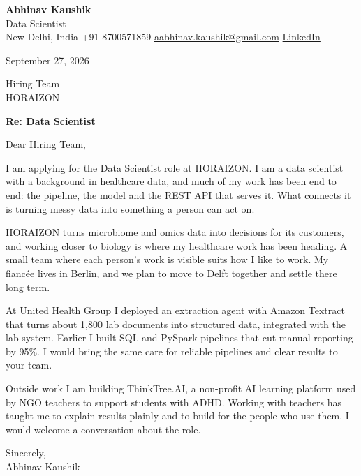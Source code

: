 \documentclass[11pt,a4paper]{article}
\begin{document}
{\Large\bfseries Abhinav Kaushik}\\
Data Scientist\\
New Delhi, India \textbar{} +91 8700571859 \textbar{} \href{mailto:aabhinav.kaushik@gmail.com}{aabhinav.kaushik@gmail.com} \textbar{} \href{https://www.linkedin.com/in/abhinav-kaushik10/}{LinkedIn}  

September 27, 2026

Hiring Team\\
HORAIZON

\textbf{Re: Data Scientist}

Dear Hiring Team,

I am applying for the Data Scientist role at HORAIZON. I am a data scientist with a background in healthcare data, and much of my work has been end to end: the pipeline, the model and the REST API that serves it. What connects it is turning messy data into something a person can act on.

HORAIZON turns microbiome and omics data into decisions for its customers, and working closer to biology is where my healthcare work has been heading. A small team where each person's work is visible suits how I like to work. My fiancée lives in Berlin, and we plan to move to Delft together and settle there long term.

At United Health Group I deployed an extraction agent with Amazon Textract that turns about 1,800 lab documents into structured data, integrated with the lab system. Earlier I built SQL and PySpark pipelines that cut manual reporting by 95\%. I would bring the same care for reliable pipelines and clear results to your team.

Outside work I am building ThinkTree.AI, a non-profit AI learning platform used by NGO teachers to support students with ADHD. Working with teachers has taught me to explain results plainly and to build for the people who use them. I would welcome a conversation about the role.

Sincerely,\\[4pt]
Abhinav Kaushik
\end{document}
